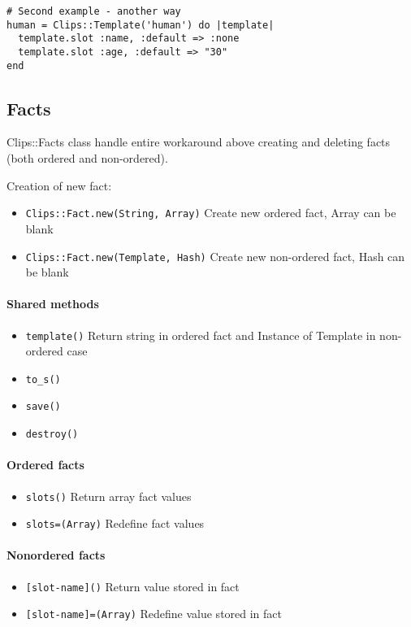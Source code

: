 \documentclass[a4paper,10pt]{article}
\begin{document}
\begin{verbatim}
# Second example - another way
human = Clips::Template('human') do |template|
  template.slot :name, :default => :none
  template.slot :age, :default => "30"
end
\end{verbatim}

\subsection{Facts}
Clips::Facts class handle entire workaround above creating and deleting facts (both ordered and non-ordered). 

Creation of new fact:
\begin{itemize}
 \item \texttt{Clips::Fact.new(String, Array)} Create new ordered fact, Array can be blank
 \item \texttt{Clips::Fact.new(Template, Hash)} Create new non-ordered fact, Hash can be blank
\end{itemize}

\paragraph{Shared methods}
\begin{itemize}
 \item \texttt{template()} Return string in ordered fact and Instance of Template in non-ordered case
 \item \texttt{to\_s()}
 \item \texttt{save()}
 \item \texttt{destroy()}
\end{itemize}

\paragraph{Ordered facts}
\begin{itemize}
 \item \texttt{slots()} Return array fact values
 \item \texttt{slots=(Array)} Redefine fact values
\end{itemize}
\paragraph{Nonordered facts}
\begin{itemize}
 \item \texttt{[slot-name]()} Return value stored in fact
 \item \texttt{[slot-name]=(Array)} Redefine value stored in fact
\end{itemize}
\end{document}
